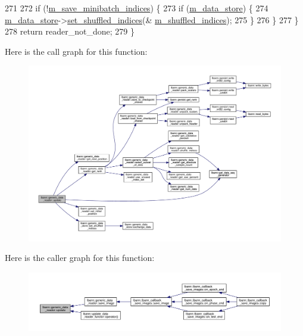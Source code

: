 \begin{DoxyCode}
271 
272     \textcolor{keywordflow}{if} (!\hyperlink{classlbann_1_1generic__data__reader_ab1d7cac44072bd1f67291c6169414112}{m\_save\_minibatch\_indices}) \{
273       \textcolor{keywordflow}{if} (\hyperlink{classlbann_1_1generic__data__reader_aefc076b842933a882214f4f709ca49c9}{m\_data\_store}) \{
274         \hyperlink{classlbann_1_1generic__data__reader_aefc076b842933a882214f4f709ca49c9}{m\_data\_store}->\hyperlink{classlbann_1_1generic__data__store_abdf41bf60ba37fa3de49c65c178dc7b0}{set\_shuffled\_indices}(&
      \hyperlink{classlbann_1_1generic__data__reader_aaab6aeff67ffff1c689336851fec2c57}{m\_shuffled\_indices});
275       \}
276     \}
277   \}
278   \textcolor{keywordflow}{return} reader\_not\_done;
279 \}
\end{DoxyCode}
Here is the call graph for this function\+:\nopagebreak
\begin{figure}[H]
\begin{center}
\leavevmode
\includegraphics[width=350pt]{classlbann_1_1generic__data__reader_a1d10dec5713fbe60e61b4dc400227ade_cgraph}
\end{center}
\end{figure}
Here is the caller graph for this function\+:\nopagebreak
\begin{figure}[H]
\begin{center}
\leavevmode
\includegraphics[width=350pt]{classlbann_1_1generic__data__reader_a1d10dec5713fbe60e61b4dc400227ade_icgraph}
\end{center}
\end{figure}
\mbox{\label{classlbann_1_1generic__data__reader_afa621af16f1a582b5a22405b79dbe052}} 
